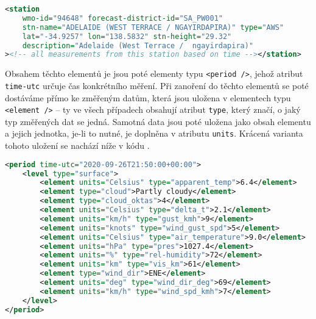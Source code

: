 \documentclass[10pt,a4paper,titlepage]{extarticle}
\begin{document}
\begin{lstlisting}[language=XML,caption={Ukázka způsobu uložení informací týkajících se konkrétní stanice.},
label=lst:station-example]
<station
    wmo-id="94648" forecast-district-id="SA_PW001"
    stn-name="ADELAIDE (WEST TERRACE / NGAYIRDAPIRA)" type="AWS"
    lat="-34.9257" lon="138.5832" stn-height="29.32"
    description="Adelaide (West Terrace /  ngayirdapira)"
><!-- all measurements from this station based on time --></station>\end{lstlisting}
Obsahem těchto elementů je jsou poté elementy typu \texttt{<period />}, jehož atribut \texttt{time-utc} určuje čas
konkrétního měření. Při zanoření do těchto elementů se poté dostáváme přímo ke změřeným datům, která jsou uložena v
elementech typu \texttt{<element />} -- ty ve všech případech obsahují atribut \texttt{type}, který značí, o jaký typ
změřených dat se jedná. Samotná data jsou poté uložena jako obsah elementu a jejich jednotka, je-li to nutné, je
doplněna v atributu \texttt{units}. Krácená varianta tohoto uložení se nachází níže v kódu
.
\begin{lstlisting}[language=XML,caption={Ukázka uložení meteorologických dat změřených v \textit{21:50:00 UTC 26.9
.2020}}, label=lst:measurement-example]
<period time-utc="2020-09-26T21:50:00+00:00">
    <level type="surface">
        <element units="Celsius" type="apparent_temp">6.4</element>
        <element type="cloud">Partly cloudy</element>
        <element type="cloud_oktas">4</element>
        <element units="Celsius" type="delta_t">2.1</element>
        <element units="km/h" type="gust_kmh">9</element>
        <element units="knots" type="wind_gust_spd">5</element>
        <element units="Celsius" type="air_temperature">9.0</element>
        <element units="hPa" type="pres">1027.4</element>
        <element units="%" type="rel-humidity">72</element>
        <element units="km" type="vis_km">61</element>
        <element type="wind_dir">ENE</element>
        <element units="deg" type="wind_dir_deg">69</element>
        <element units="km/h" type="wind_spd_kmh">7</element>
    </level>
</period>\end{lstlisting}%
\end{document}
